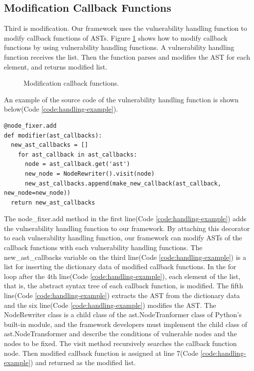 \documentclass[conference]{IEEEtran}
\begin{document}
\subsection{Modification Callback Functions}
Third is modification.
Our framework uses the vulnerability handling function to modify callback functions of ASTs.
Figure \ref{fig:modification} shows how to modify callback functions by using vulnerability handling functions.
A vulnerability handling function receives the list.
Then the function parses and modifies the AST for each element, and returns modified list.
\begin{figure}[htbp]
\caption{Modification callback functions.}
\label{fig:modification}
\end{figure}
An example of the source code of the vulnerability handling function is shown below(Code \ref{code:handling-example}).
\begin{lstlisting}[caption={An example of a vulnerability handling function}, label=code:handling-example, captionpos=b]
@node_fixer.add
def modifier(ast_callbacks):
  new_ast_callbacks = []
    for ast_callback in ast_callbacks:
      node = ast_callback.get('ast')
      new_node = NodeRewriter().visit(node)
      new_ast_callbacks.append(make_new_callback(ast_callback, new_node=new_node))
  return new_ast_callbacks
\end{lstlisting}

The node\_fixer.add method in the first line(Code \ref{code:handling-example}) adds the vulnerability handling function to our framework.
By attaching this decorator to each vulnerability handling function, our framework can modify ASTs of the callback functions with each vulnerability handling functions.
The new\_ast\_callbacks variable on the third line(Code \ref{code:handling-example}) is a list for inserting the dictionary data of modified callback functions.
In the for loop after the 4th line(Code \ref{code:handling-example}), each element of the list, that is, the abstract syntax tree of each callback function, is modified.
The fifth line(Code \ref{code:handling-example}) extracts the AST from the dictionary data and the six line(Code \ref{code:handling-example}) modifies the AST.
The NodeRewriter class is a child class of the ast.NodeTranformer class of Python's built-in module, and the framework developers must implement the child class of ast.NodeTransformer and describe the conditions of vulnerable nodes and the nodes to be fixed.
The visit method recursively searches the callback function node.
Then modified callback function is assigned at line 7(Code \ref{code:handling-example}) and returned as the modified list.
\end{document}
